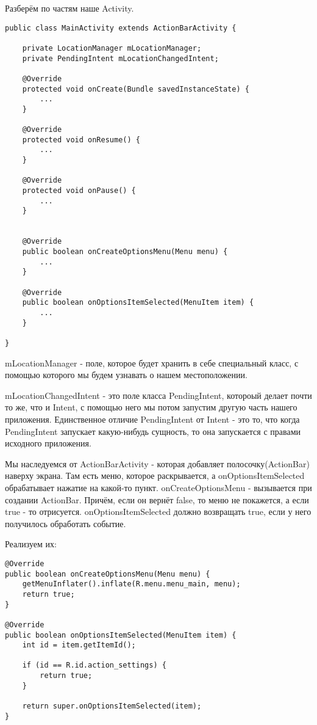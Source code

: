 \documentclass[12 pt]{article}
\begin{document}
    Разберём по частям наше Activity. 
    
    \begin{lstlisting}
public class MainActivity extends ActionBarActivity {

    private LocationManager mLocationManager;
    private PendingIntent mLocationChangedIntent;

    @Override
    protected void onCreate(Bundle savedInstanceState) {
        ...
    }

    @Override
    protected void onResume() {
        ...
    }

    @Override
    protected void onPause() {
        ...
    }


    @Override
    public boolean onCreateOptionsMenu(Menu menu) {
        ...
    }

    @Override
    public boolean onOptionsItemSelected(MenuItem item) {
        ...
    }

}
    \end{lstlisting}
    
    mLocationManager - поле, которое будет хранить в себе специальный класс, с помощью которого мы будем узнавать о нашем местоположении. 
    
    mLocationChangedIntent - это поле класса PendingIntent, котороый делает почти то же, что и Intent, с помощью него мы потом запустим другую часть нашего приложения. Единственное отличие PendingIntent от Intent - это то, что когда PendingIntent запускает какую-нибудь сущность, то она запускается с правами исходного приложения. 
    
    Мы наследуемся от ActionBarActivity - которая добавляет полосочку(ActionBar) наверху экрана. Там есть меню, которое раскрывается, а onOptionsItemSelected обрабатывает нажатие на какой-то пункт. onCreateOptionsMenu - вызывается при создании ActionBar. Причём, если он вернёт false, то меню не покажется, а если true - то отрисуется. onOptionsItemSelected должно возвращать true, если у него получилось обработать событие.
    
    Реализуем их:
    
    \begin{lstlisting}
@Override
public boolean onCreateOptionsMenu(Menu menu) {
    getMenuInflater().inflate(R.menu.menu_main, menu);
    return true;
}

@Override
public boolean onOptionsItemSelected(MenuItem item) {
    int id = item.getItemId();

    if (id == R.id.action_settings) {
        return true;
    }

    return super.onOptionsItemSelected(item);
}    
    \end{lstlisting} 
    
\end{document}
